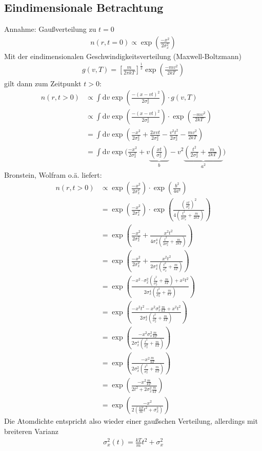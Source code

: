 \documentclass[9pt,a4paper]{extarticle}
\begin{document}
\subsection*{Eindimensionale Betrachtung}
Annahme: Gaußverteilung zu $t = 0$
\begin{align}
n(r, t= 0) \varpropto \exp\left(\frac{-x^2}{2 \sigma_x^2}\right)
\end{align}
Mit der eindimensionalen Geschwindigkeitsverteilung (Maxwell-Boltzmann) 
\begin{align}
g(v,T) = \left[\frac{m}{2 \pi k T}\right]^{\frac{1}{2}} \exp \left(\frac{-mv^2}{2kT}\right)
\end{align}
gilt dann zum Zeitpunkt $t>0$:
\begin{align}
n(r, t> 0) &\varpropto \int \mathrm{d}v \exp\left(\frac{-(x-vt)^2}{2 \sigma_x^2}\right) \cdot g(v,T) \\
&\varpropto \int \mathrm{d}v \exp\left(\frac{-(x-vt)^2}{2 \sigma_x^2}\right) \cdot \exp \left(\frac{-mv^2}{2kT}\right) \\
&= \int \mathrm{d}v \exp\left(\frac{-x^2}{2 \sigma_x^2} + \frac{2xvt}{2 \sigma_x^2} - \frac{v^2 t^2}{2 \sigma_x^2} - \frac{mv^2}{2kT}\right) \\
&= \int \mathrm{d}v \exp\biggl(\frac{-x^2}{2 \sigma_x^2} + v \underbrace{\left( \frac{xt}{\sigma_x^2}\right)}_{b} - v^2 \underbrace{\left(\frac{t^2}{2 \sigma_x^2} + \frac{m}{2kT} \right)}_{a^2}\biggr) 
\end{align}
Bronstein, Wolfram o.ä. liefert:
\begin{align}
n(r, t> 0) &\varpropto \exp\left(\frac{-x^2}{2 \sigma_x^2}\right) \cdot \exp \left(\frac{b^2}{4a^2}\right) \\
&= \exp\left(\frac{-x^2}{2 \sigma_x^2}\right) \cdot \exp \left(\frac{\left( \frac{xt}{\sigma_x^2}\right)^2}{4\left(\frac{t^2}{2 \sigma_x^2} + \frac{m}{2kT} \right)}\right) \\
&= \exp\left(\frac{-x^2}{2 \sigma_x^2} + \frac{x^2t^2}{4\sigma_x^4\left(\frac{t^2}{2 \sigma_x^2} + \frac{m}{2kT} \right)}\right) \\
&= \exp\left(\frac{-x^2}{2 \sigma_x^2} + \frac{x^2t^2}{2\sigma_x^4\left(\frac{t^2}{\sigma_x^2} + \frac{m}{kT} \right)}\right) \\
&= \exp\left(\frac{-x^2 \cdot \sigma_x^2\left(\frac{t^2}{\sigma_x^2} + \frac{m}{kT} \right) +x^2t^2}{2\sigma_x^4\left(\frac{t^2}{\sigma_x^2} + \frac{m}{kT} \right)}\right) \\
&= \exp\left(\frac{-x^2 t^2 -  x^2 \sigma_x^2 \frac{m}{kT} +x^2t^2}{2\sigma_x^4\left(\frac{t^2}{\sigma_x^2} + \frac{m}{kT} \right)}\right) \\
&= \exp\left(\frac{- x^2 \sigma_x^2 \frac{m}{kT}}{2\sigma_x^4\left(\frac{t^2}{\sigma_x^2} + \frac{m}{kT} \right)}\right) \\
&= \exp\left(\frac{- x^2 \frac{m}{kT}}{2\sigma_x^2\left(\frac{t^2}{\sigma_x^2} + \frac{m}{kT} \right)}\right) \\
&= \exp\left(\frac{- x^2 \frac{m}{kT}}{2t^2 +2 \sigma_x^2 \frac{m}{kT} }\right) \\
&= \exp\left(\frac{- x^2 }{2\left(\frac{kT}{m}t^2 + \sigma_x^2\right)}\right) 
\end{align}
Die Atomdichte entspricht also wieder einer gaußschen Verteilung, allerdings mit breiteren Varianz
\begin{align}
\sigma_x^2 \left(t\right) = \frac{kT}{m}t^2 + \sigma_x^2
\end{align}
\end{document}
